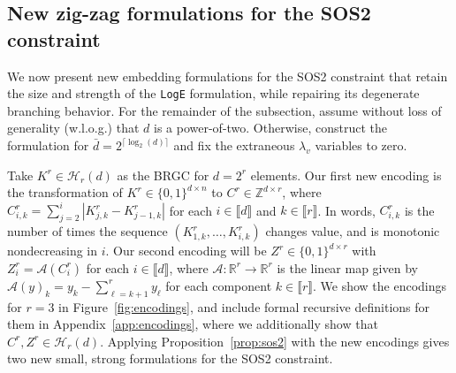 \documentclass[opre,nonblindrev]{informs3} %
\newcommand{\scrA}{\mathscr{A}}
\newcommand{\bbR}{\mathbb{R}}
\newcommand{\bbZ}{\mathbb{Z}}
\newcommand{\Log}{\texttt{LogE}}
\begin{document}
\subsection{New zig-zag formulations for the SOS2 constraint}

We now present new embedding formulations for the SOS2 constraint that retain the size and strength of the \Log{} formulation, while repairing its degenerate branching behavior. For the remainder of the subsection, assume without loss of generality (w.l.o.g.) that $d$ is a power-of-two. Otherwise, construct the formulation for $\bar{d} = 2^{\lceil \log_2(d) \rceil}$ and fix the extraneous $\lambda_v$ variables to zero.

Take $K^r \in \mathcal{H}_r(d)$ as the BRGC for $d=2^r$ elements. Our first new encoding is the transformation of $K^r\in \{0,1\}^{d \times n}$ to $C^r \in \bbZ^{d \times r}$, where $C^r_{i,k} = \sum_{j=2}^i \left| K^r_{j,k}-K^r_{j-1,k} \right|$ for each $i \in \llbracket d \rrbracket$ and $k \in \llbracket r \rrbracket$. In words, $C^r_{i,k}$ is the number of times the sequence $(K^r_{1,k},\ldots,K^r_{i,k})$ changes value, and is monotonic nondecreasing in $i$. Our second encoding will be $Z^r \in \{0,1\}^{d \times r}$ with $Z^r_{i} = \scrA(C^r_i)$ for each $i \in \llbracket d \rrbracket$, where $\scrA : \bbR^r \to \bbR^r$ is the linear map  given by $\scrA(y)_k = y_k - \sum_{\ell=k+1}^r y_\ell$ for each component $k \in \llbracket r \rrbracket$. We show the encodings for $r=3$ in Figure~\ref{fig:encodings}, and include formal recursive definitions for them in Appendix~\ref{app:encodings}, where we additionally show that $C^r, Z^r \in \mathcal{H}_r(d)$. Applying Proposition~\ref{prop:sos2} with the new encodings gives two new small, strong formulations for the SOS2 constraint.
\end{document}
